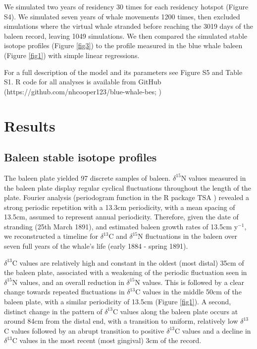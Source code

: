 \documentclass[a4paper,12pt]{article}
\begin{document}
We simulated two years of residency 30 times for each residency hotspot (Figure S4). 
We simulated seven years of whale movements 1200 times, then excluded simulations where the virtual whale stranded before reaching the 3019 days of the baleen record, leaving 1049 simulations. 
We then compared the simulated stable isotope profiles (Figure \ref{fig3}) to the profile measured in the blue whale baleen (Figure \ref{fig1}) with simple linear regressions.

For a full description of the model and its parameters see Figure S5 and Table S1. 
R code for all analyses is available from GitHub (https://github.com/nhcooper123/blue-whale-bes; \citep{github})

\section{Results}

\subsection{Baleen stable isotope profiles}
The baleen plate yielded 97 discrete samples of baleen.
\(\delta^{15}\)N values measured in the baleen plate display regular cyclical fluctuations throughout the length of the plate. Fourier analysis (periodogram function in the R package TSA \citep{Chan:2012aa}) revealed a strong periodic repetition with a 13.3cm periodicity, with a mean spacing of 13.5cm, assumed to represent annual periodicity. 
Therefore, given the date of stranding (25th March 1891), and estimated baleen growth rates of 13.5cm y$^{-1}$, we reconstructed a timeline for \(\delta^{13}\)C and \(\delta^{15}\)N fluctuations in the baleen over seven full years of the whale’s life (early 1884 - spring 1891). 

\(\delta^{13}\)C values are relatively high and constant in the oldest (most distal) 35cm of the baleen plate, associated with a weakening of the periodic fluctuation seen in \(\delta^{15}\)N values, and an overall reduction in \(\delta^{15}\)N values. 
This is followed by a clear change towards repeated fluctuations in \(\delta^{13}\)C values in the middle 50cm of the baleen plate, with a similar periodicity of 13.5cm (Figure \ref{fig1}). 
A second, distinct change in the pattern of \(\delta^{13}\)C values along the baleen plate occurs at around 84cm from the distal end, with a transition to uniform, relatively low \(\delta^{13}\)C values followed by an abrupt transition to positive \(\delta^{13}\)C values and a decline in \(\delta^{13}\)C values in the most recent (most gingival) 3cm of the record.
\end{document}
